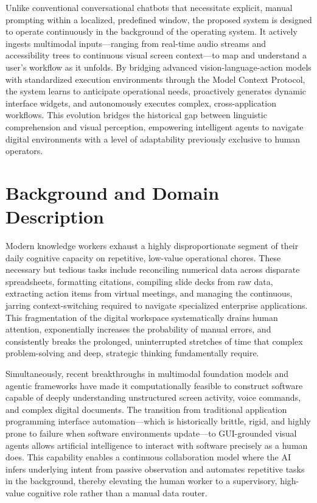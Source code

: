 \documentclass[12pt, a4paper]{report}
\begin{document}
Unlike conventional conversational chatbots that necessitate explicit, manual prompting within a localized, predefined window, the proposed system is designed to operate continuously in the background of the operating system.\cite{hojo2025} It actively ingests multimodal inputs—ranging from real-time audio streams and accessibility trees to continuous visual screen context—to map and understand a user's workflow as it unfolds.\cite{hojo2025} By bridging advanced vision-language-action models with standardized execution environments through the Model Context Protocol, the system learns to anticipate operational needs, proactively generates dynamic interface widgets, and autonomously executes complex, cross-application workflows.\cite{hojo2025} This evolution bridges the historical gap between linguistic comprehension and visual perception, empowering intelligent agents to navigate digital environments with a level of adaptability previously exclusive to human operators.\cite{openreview2026}

\section{Background and Domain Description}
Modern knowledge workers exhaust a highly disproportionate segment of their daily cognitive capacity on repetitive, low-value operational chores.\cite{hojo2025} These necessary but tedious tasks include reconciling numerical data across disparate spreadsheets, formatting citations, compiling slide decks from raw data, extracting action items from virtual meetings, and managing the continuous, jarring context-switching required to navigate specialized enterprise applications.\cite{hojo2025} This fragmentation of the digital workspace systematically drains human attention, exponentially increases the probability of manual errors, and consistently breaks the prolonged, uninterrupted stretches of time that complex problem-solving and deep, strategic thinking fundamentally require.\cite{hojo2025}

Simultaneously, recent breakthroughs in multimodal foundation models and agentic frameworks have made it computationally feasible to construct software capable of deeply understanding unstructured screen activity, voice commands, and complex digital documents.\cite{hojo2025} The transition from traditional application programming interface automation—which is historically brittle, rigid, and highly prone to failure when software environments update—to GUI-grounded visual agents allows artificial intelligence to interact with software precisely as a human does.\cite{openreview2026} This capability enables a continuous collaboration model where the AI infers underlying intent from passive observation and automates repetitive tasks in the background, thereby elevating the human worker to a supervisory, high-value cognitive role rather than a manual data router.\cite{hojo2025}
\end{document}
